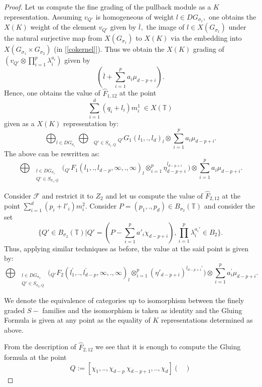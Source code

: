 \documentclass[10pt,a4paper]{amsart}
\begin{document}
\begin{proof}
Let us compute the fine grading of the pullback module as a $K$ representation. Assuming $v_{Q'}$ is homogeneous of weight $l\in DG_{\sigma_1},$ one obtains the $X(K)$ weight of the element $v_{Q'}$ given by $\overline{l},$ the image of $l\in X(G_{\sigma_1})$ under the natural surjective map from $X(G_{\sigma_1})$ to $X(K)$ via the embedding into $X(G_{\sigma_1}\times G_{\sigma_2})$ (in [\ref{cokernel}]). Thus we obtain the $X(K)$ grading of $(v_{Q'}\otimes \prod_{i=1}^{p}\lambda_{i}^{a_i})$ given by $$(\overline{l}+\sum_{i=1}^{p}a_{i}\mu_{d-p+i}).$$ Hence, one obtains the value of $\hat{F}_{1,12}$ at the point $$\sum_{i=1}^{d}(q_i+l_i)m^1_i\ \in X(\mathbb{T})$$ given as a $X(K)$ representation by:
$$\bigoplus_{l\in DG_{\sigma_1}}\bigoplus_{\quad Q'\in S_{\sigma_1,Q}}{}_{Q'}G_{1}(l_1,.,l_d)_{l}\otimes {\sum_{i=1}^{p}a_i\mu_{d-p+i}}.$$ The above can be rewritten as:
$$\bigoplus_{\begin{array}{cc}
     &  l\in DG_{\sigma_1}\\
     & Q'\in S_{\sigma_1,Q}
\end{array}} \big ({}_{Q'}F_{1}(l_1,.,l_{d-p},\infty,.,\infty)_{l} \otimes_{i=1}^{p}\eta_{d-p+i}^{l_{d-p+i}}\ \bigl)\otimes \sum_{i=1}^{p}a_i\mu_{d-p+i}.$$\par
Consider $\mathscr{F}$ and restrict it to $Z_2$ and let us compute the value of $\hat{F}_{2,12}$ at the point $\sum_{i=1}^{d}(p_i+l'_i)m^2_{i}.$\newline
Consider $P=(p_1,.,p_d)\in B_{\sigma_2}(\mathbb{T})$ and consider the set $$\bigl\{Q'\in B_{\sigma_2}(\mathbb{T})|Q'=(P-\sum_{i=1}^{p}a'_i\chi_{d-p+i}),\prod_{i=1}^{p}\lambda_{i}^{a_{i}'}\in B_{2}\bigl\}.$$ Thus, applying similar techniques as before, the value at the said point is given by:
$$\bigoplus_{{\begin{array}{cc}
     &  l\in DG_{\sigma_2}\\
     & Q'\in S_{\sigma_2,Q}
\end{array}}}\big ({}_{Q'}F_{2}(l_1^{'},.,l_{d-p}^{'},\infty,.,\infty)_{l}\otimes _{i=1}^{p}(\eta'_{d-p+i})^{l_{d-p+i}'}\big )\otimes \sum_{i=1}^{p}a_i^{'}\mu_{d-p+i}.$$
\par 
We denote the equivalence of categories up to isomorphism between the finely graded $S-$ families and the isomorphism is taken as identity and the Gluing Formula is given at any point as the equality of $K$ representations determined as above. \par
From the description of $\hat{F}_{2,12}$ we see that it is enough to compute the Gluing formula at the point $$Q:=[\chi_1,..,\chi_{d-p}\  \chi_{d-p+1},..,\chi_{d}]\begin{pmatrix}

\end{pmatrix}$$
\end{proof}
\end{document}

